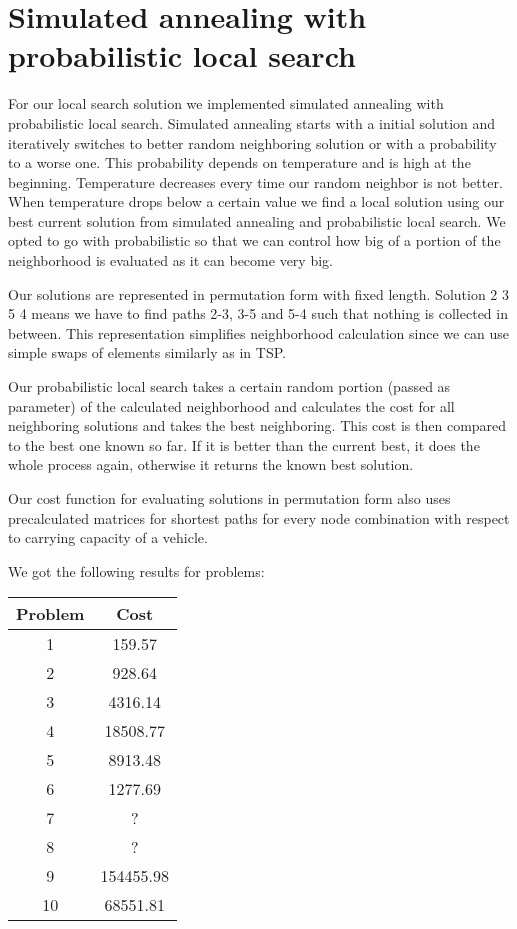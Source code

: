 \documentclass[a4paper, 12pt]{article}
\begin{document}
\newpage

\section{Simulated annealing with probabilistic local search}

For our local search solution we implemented simulated annealing with 
probabilistic local search.
Simulated annealing starts with a initial solution and iteratively switches to
better random neighboring solution or with a probability to a worse one. This
probability depends on temperature and is high at the beginning. Temperature
decreases every time our random neighbor is not better. When temperature drops
below a certain value we find a local solution using 
our best current solution from simulated annealing and probabilistic local search.
We opted to go with probabilistic so that we can control
how big of  a portion of the neighborhood is evaluated as it can become very big.

Our solutions are represented in permutation form with fixed length. Solution
2 3 5 4 means we have to find paths 2-3, 3-5 and 5-4 such that nothing is
collected in between. This representation simplifies neighborhood calculation
since we can use simple swaps of elements similarly as in TSP.

Our probabilistic local search takes a certain random portion (passed as parameter)
of the calculated neighborhood and calculates the cost for all neighboring solutions 
and takes the best neighboring. This cost is then compared to the best one known 
so far. If it is better than the current best, it does the whole process again, 
otherwise it returns the known best solution.

Our cost function for evaluating solutions in permutation form also uses
precalculated matrices for shortest paths for every node combination with
respect to carrying capacity of a vehicle.

We got the following results for problems:
\begin{center}
\begin{tabular}{ c|c }
	Problem & Cost \\
	\hline
	1 & 159.57 \\
	2 & 928.64 \\
	3 & 4316.14 \\
	4 & 18508.77 \\
	5 & 8913.48 \\
	6 & 1277.69 \\
	7 & ? \\
	8 & ? \\
	9 & 154455.98 \\
	10 & 68551.81 \\
\end{tabular}
\end{center}
\end{document}
